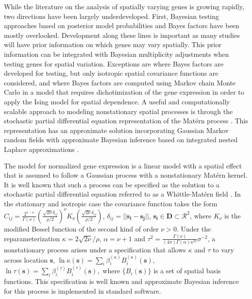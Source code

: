 \documentclass[pdflatex,sn-mathphys-num]{sn-jnl}%
\theoremstyle{thmstyleone}%
\theoremstyle{thmstyletwo}%
\theoremstyle{thmstylethree}%
\begin{document}
While the literature on the analysis of spatially varying genes is growing rapidly, two directions have been largely underdeveloped. First, Bayesian testing approaches based on posterior model probabilities and Bayes factors have been mostly overlooked. Development along these lines is important as many studies will have prior information on which genes may vary spatially. This prior information can be integrated with Bayesian multiplicity adjustments when testing genes for spatial variation. Exceptions are \cite{li2021bayesian} where Bayes factors are developed for testing, but only isotropic spatial covariance functions are considered, and \cite{jiang2022bayesian} where Bayes factors are computed using Markov chain Monte Carlo in a model that requires dichotimization of the gene expression in order to apply the Ising model for spatial dependence. A useful and computationally scalable approach to modeling nonstationary spatial processes is through the stochastic partial differential equation representation of the Mat\'ern process \cite{lindgren2011explicit}. This representation has an approximate solution incorporating Gaussian Markov random fields with approximate Bayesian inference based on integrated nested Laplace approximations \cite{rue2009approximate}.

 The model for normalized gene expression is a linear model with a spatial effect that is assumed to follow a Gaussian process with a nonstationary Mat\'ern kernel. It is well known that such a process can be specified as the solution to a stochastic partial differential equation referred to as a Whittle-Mat\'ern field \cite{lindgren2022spde}. In the stationary and isotropic case the covariance function takes the form $C_{ij} = \frac{2^{1-\nu}}{\Gamma(\nu)}(\frac{\sqrt{2\nu}\delta_{ij}}{\rho/2})^\nu K_{\nu}(\frac{\sqrt{2\nu}\delta_{ij}}{\rho/2})$, $\delta_{ij} = ||\mathbf{s_{i}}-\mathbf{s_{j}}||$, $\mathbf{s_{i}} \in \mathbf{D} \subset \mathcal{R}^{2}$, where $K_{\nu}$ is the modified Bessel function of the second kind of order $\nu >0$. Under the reparameterization $\kappa = 2\sqrt{2 \nu}/\rho$, $\alpha = \nu+1$ and $\tau^{2} = \frac{\Gamma(\nu)}{(4\pi)\Gamma(\alpha)\kappa^{2\nu}}\sigma^{-2}$, a nonstationary process arises under a specification that allows $\kappa$ and $\tau$ to vary across location $\mathbf{s}$,
$
\ln \kappa(\mathbf{s}) = \sum_{i}\beta^{(\kappa)}_{i}B_{i}^{(\kappa)}(\mathbf{s}),\,\,
$
$
\ln \tau(\mathbf{s}) = \sum_{i}\beta^{(\tau)}_{i}B_{i}^{(\tau)}(\mathbf{s}),
$
where $\{B_{i}(\mathbf{s})\}$ is a set of spatial basis functions. This specification is well known and approximate Bayesian inference for this process is implemented in standard software.
\end{document}

